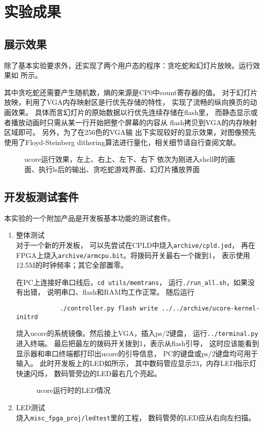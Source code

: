
\section{实验成果}

\subsection{展示效果}
除了基本实验要求外，还实现了两个用户态的程序：贪吃蛇和幻灯片放映。运行效果如
所示。

其中贪吃蛇还需要产生随机数，熵的来源是CP0中count寄存器的值。
对于幻灯片放映，利用了VGA内存映射区是行优先存储的特性，
实现了流畅的纵向换页的动画效果。
具体而言幻灯片的原始数据以行优先连续存储在flash里，
而静态显示或者播放动画时只需从某一行开始把整个屏幕的内容从
flash拷贝到VGA的内存映射区域即可。
另外，为了在256色的VGA输
出下实现较好的显示效果，对图像预先使用了Floyd-Steinberg
dithering算法进行量化，相关细节请自行查阅文献。

\begin{figure}[!ht]
	\caption{\label{fig:ucore}ucore运行效果，左上、右上、左下、右下
	依次为刚进入shell时的画面、执行ls后的输出、贪吃蛇游戏界面、幻灯片播放界面}
\end{figure}


\subsection{开发板测试套件}
本实验的一个附加产品是开发板基本功能的测试套件。

\begin{enumerate}
	\item 整体测试 \\
		对于一个新的开发板，
		可以先尝试在CPLD中烧入\verb|archive/cpld.jed|，
		再在FPGA上烧入\verb|archive/armcpu.bit|。将拨码开关最右一个拨到1，
		表示使用12.5M的时钟频率；其它全部置零。

		在PC上连接好串口线后，\verb|cd utils/memtrans|，
		运行\verb|./run_all.sh|，如果没有出错，
		说明串口、flash和RAM均工作正常。
		随后运行
		\begin{verbatim}
			./controller.py flash write ../../archive/ucore-kernel-initrd
		\end{verbatim}
		烧入ucore的系统镜像。然后接上VGA，插入ps/2键盘，
		运行\verb|../terminal.py|进入终端。
		最后把最左的拨码开关拨到1，表示从flash引导，
		这时应该能看到显示器和串口终端都打印出ucore的引导信息，
		PC的键盘或ps/2键盘均可用于输入。
		此时开发板上的LED如所示，
		其中数码管应显示23，内存LED指示灯快速闪烁，
		数码管旁边的LED最右几个亮起。
		\begin{figure}[!ht]
			\caption{\label{fig:led}ucore运行时的LED情况}
		\end{figure}
	\item LED测试 \\
		烧入\verb|misc_fpga_proj/ledtest|里的工程，
		数码管旁的LED应从右向左扫描。
\end{enumerate}


